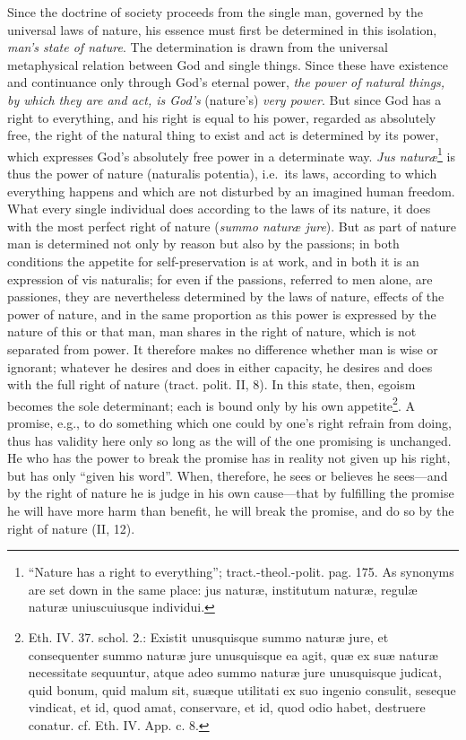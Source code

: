 \documentclass[12pt,a4paper,openany]{book}
\newcommand{\opage}[1]{\marginnote{\footnotesize\textit{[#1]}}}
\begin{document}
Since the doctrine of society proceeds from the single man, governed by the universal laws of nature, his essence must first be determined in this isolation, \emph{man's state of nature}. The determination is drawn from the universal metaphysical relation between God and single
\opage{134}\setcounter{footnote}{0}things. Since these have existence and continuance only through God's eternal power, \emph{the power of natural things, by which they are and act, is God's} (nature's) \emph{very power}. But since God has a right to everything, and his right is equal to his power, regarded as absolutely free, the right of the natural thing to exist and act is determined by its power, which expresses God's absolutely free power in a determinate way. \emph{Jus naturæ}\footnote{``Nature has a right to everything''; tract.-theol.-polit. pag. 175. As synonyms are set down in the same place: jus naturæ, institutum naturæ, regulæ naturæ uniuscuiusque individui.} is thus the power of nature (naturalis potentia), i.e.\ its laws, according to which everything happens and which are not disturbed by an imagined human freedom. What every single individual does according to the laws of its nature, it does with the most perfect right of nature (\emph{summo naturæ jure}). But as part of nature man is determined not only by reason but also by the passions; in both conditions the appetite for self-preservation is at work, and in both it is an expression of vis naturalis; for even if the passions, referred to men alone, are passiones, they are nevertheless determined by the laws of nature, effects of the power of nature, and in the same proportion as this power is expressed by the nature of this or that man, man shares in the right of nature, which is not separated from power. It therefore makes no difference whether man is wise or ignorant; whatever he desires and does in either capacity, he desires and does with the full right of nature (tract. polit. II, 8). In this state, then, egoism becomes the sole determinant; each is bound only by his own appetite\footnote{Eth. IV. 37. schol. 2.: Existit unusquisque summo naturæ jure, et consequenter summo naturæ jure unusquisque ea agit, quæ ex suæ naturæ necessitate sequuntur, atque adeo summo naturæ jure unusquisque judicat, quid bonum, quid malum sit, suæque utilitati ex suo ingenio consulit, seseque vindicat, et id, quod amat, conservare, et id, quod odio habet, destruere conatur. cf. Eth. IV. App. c. 8.}. A promise, e.g., to do something which one could by one's right refrain from doing, thus has
\opage{135}\setcounter{footnote}{0}validity here only so long as the will of the one promising is unchanged. He who has the power to break the promise has in reality not given up his right, but has only ``given his word''. When, therefore, he sees or believes he sees---and by the right of nature he is judge in his own cause---that by fulfilling the promise he will have more harm than benefit, he will break the promise, and do so by the right of nature (II, 12).
\end{document}
